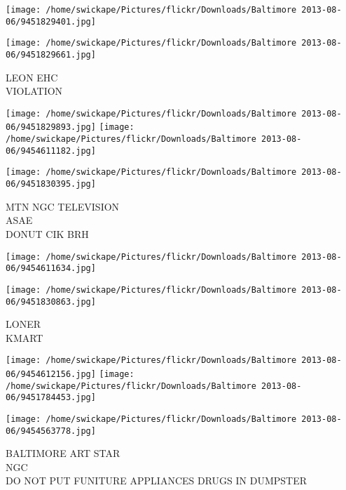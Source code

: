 \documentclass[10pt,letterpaper]{article}
\begin{document}
\texttt{[image: /home/swickape/Pictures/flickr/Downloads/Baltimore 2013-08-06/9451829401.jpg]}

\vspace{0.25in}
\texttt{[image: /home/swickape/Pictures/flickr/Downloads/Baltimore 2013-08-06/9451829661.jpg]}

LEON EHC\\
VIOLATION\\
\pagebreak

\texttt{[image: /home/swickape/Pictures/flickr/Downloads/Baltimore 2013-08-06/9451829893.jpg]}
\texttt{[image: /home/swickape/Pictures/flickr/Downloads/Baltimore 2013-08-06/9454611182.jpg]}

\texttt{[image: /home/swickape/Pictures/flickr/Downloads/Baltimore 2013-08-06/9451830395.jpg]}

MTN NGC TELEVISION\\
ASAE\\
DONUT CIK BRH\\
\pagebreak

\texttt{[image: /home/swickape/Pictures/flickr/Downloads/Baltimore 2013-08-06/9454611634.jpg]}

\vspace{0.25in}
\texttt{[image: /home/swickape/Pictures/flickr/Downloads/Baltimore 2013-08-06/9451830863.jpg]}

LONER\\
KMART\\
\pagebreak

\texttt{[image: /home/swickape/Pictures/flickr/Downloads/Baltimore 2013-08-06/9454612156.jpg]}
\texttt{[image: /home/swickape/Pictures/flickr/Downloads/Baltimore 2013-08-06/9451784453.jpg]}

\vspace{0.25in}
\texttt{[image: /home/swickape/Pictures/flickr/Downloads/Baltimore 2013-08-06/9454563778.jpg]}

BALTIMORE ART STAR\\
NGC\\
DO NOT PUT FUNITURE APPLIANCES DRUGS IN DUMPSTER\\
\pagebreak
\end{document}
